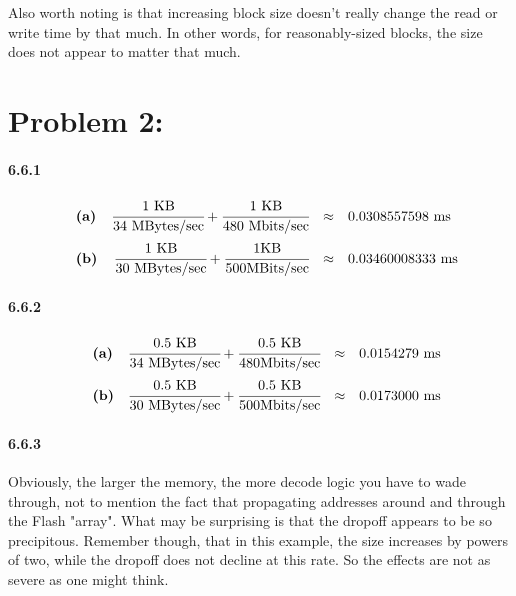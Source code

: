 \documentclass[a4paper]{article}
\begin{document}
Also worth noting is that increasing block size doesn't really change the read or write time by that much. In other words, for reasonably-sized blocks, the size does not appear to matter that much.

\section*{Problem 2:}

\paragraph{6.6.1} 

\begin{equation}
\begin{array}{llrll}
& \textbf{(a)} & \cfrac{1 \mbox{ KB}}{34 \mbox{ MBytes/sec}} + \cfrac{1 \mbox{ KB}}{480 \mbox{ Mbits/sec}} & \approx & 0.0308557598 \mbox{ ms} \\[.15in]
& \textbf{(b)} & \cfrac{1 \mbox{ KB}}{30 \mbox{ MBytes/sec}} + \cfrac{1 \mbox{KB}}{500 \mbox{MBits/sec}} & \approx & 0.03460008333 \mbox{ ms}
\end{array}
\end{equation}

\paragraph{6.6.2}

\begin{equation}
\begin{array}{llrll}
& \textbf{(a)} & \cfrac{0.5 \mbox{ KB}}{34 \mbox{ MBytes/sec}} + \cfrac{0.5 \mbox{ KB}}{480 \mbox{Mbits/sec}} & \approx & 0.0154279 \mbox{ ms} \\[.15in]
& \textbf{(b)} & \cfrac{0.5 \mbox{ KB}}{30 \mbox{ MBytes/sec}} + \cfrac{0.5 \mbox{ KB}}{500 \mbox{Mbits/sec}} & \approx & 0.0173000 \mbox{ ms}
\end{array}
\end{equation}

\paragraph{6.6.3} Obviously, the larger the memory, the more decode logic you have to wade through, not to mention the fact that propagating addresses around and through the Flash "array". What may be surprising is that the dropoff appears to be so precipitous. Remember though, that in this example, the size increases by powers of two, while the dropoff does not decline at this rate. So the effects are not as severe as one might think.
\end{document}
